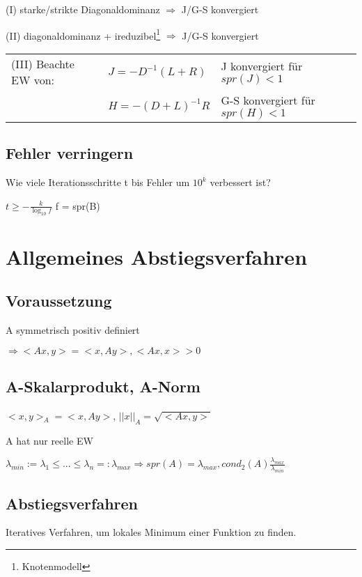 \documentclass[12pt,a4paper]{article} %
\newcommand*\tab[1][1cm]{\hspace*{#1}}
\begin{document}
	(I) starke/strikte Diagonaldominanz $\Rightarrow$ J/G-S konvergiert
	
	(II) diagonaldominanz + ireduzibel\footnote{Knotenmodell} $\Rightarrow$ J/G-S konvergiert
	
	\begin{tabular}{l l l}
		(III) Beachte EW von: & $J = -D^{-1}(L + R)$ & J konvergiert für $spr(J) < 1$ \\
		& $H = -(D + L)^{-1}R$ & G-S konvergiert für $spr(H) < 1$
	\end{tabular}
	
	\subsection{Fehler verringern}
	
	Wie viele Iterationsschritte t bis Fehler um $10^k$ verbessert ist?
	
	$t \ge -\frac{k}{\log_{10}f}$ \tab f = spr(B)
	
	\newpage
	
	\section{Allgemeines Abstiegsverfahren}
	
	\subsection{Voraussetzung}
	
	A symmetrisch positiv definiert
	
	$\Rightarrow <Ax, y> = <x, Ay>, <Ax, x> > 0$
	
	\subsection{A-Skalarprodukt, A-Norm}
	
	$<x, y>_A = <x, Ay>$, $||x||_A = \sqrt{<Ax, y>}$
	
	A hat nur reelle EW
	
	$\lambda_{min} := \lambda_1 \le ... \le \lambda_n =: \lambda_{max} \Rightarrow spr(A) = \lambda_{max}, cond_2(A) \frac{\lambda_{max}}{\lambda_{min}}$
	
	\subsection{Abstiegsverfahren}
	
	Iteratives Verfahren, um lokales Minimum einer Funktion zu finden.
	
\end{document}
